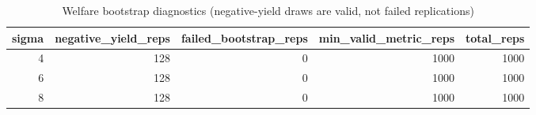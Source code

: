 \begin{table}

\caption{Welfare bootstrap diagnostics (negative-yield draws are valid, not failed replications)}
\centering
\begin{tabular}[t]{rrrrr}
\toprule
sigma & negative\_yield\_reps & failed\_bootstrap\_reps & min\_valid\_metric\_reps & total\_reps\\
\midrule
4 & 128 & 0 & 1000 & 1000\\
6 & 128 & 0 & 1000 & 1000\\
8 & 128 & 0 & 1000 & 1000\\
\bottomrule
\end{tabular}
\end{table}
